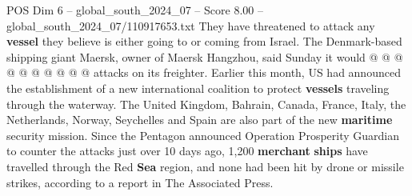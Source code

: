 \begin{textsample}{POS Dim 6 – global\_south\_2024\_07 – Score 8.00 – global\_south\_2024\_07/110917653.txt}
They have threatened to attack any \textbf{vessel} they believe is either going to or coming from Israel.
The Denmark-based shipping giant Maersk, owner of Maersk Hangzhou, said Sunday it would @ @ @ @ @ @ @ @ @ @ attacks on its freighter.
Earlier this month, US had announced the establishment of a new international coalition to protect \textbf{vessels} traveling through the waterway.
The United Kingdom, Bahrain, Canada, France, Italy, the Netherlands, Norway, Seychelles and Spain are also part of the new \textbf{maritime} security mission.
Since the Pentagon announced Operation Prosperity Guardian to counter the attacks just over 10 days ago, 1,200 \textbf{merchant} \textbf{ships} have travelled through the Red \textbf{Sea} region, and none had been hit by drone or missile strikes, according to a report in The Associated Press.

\end{textsample}

